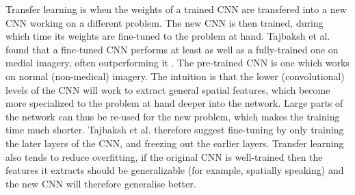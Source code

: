 Transfer learning is when the weights of a trained CNN are transfered into a new CNN working on a different problem. The new CNN is then trained, during which time its weights are fine-tuned to the problem at hand. Tajbaksh et al. found that a fine-tuned CNN performs at least as well as a fully-trained one on medial imagery, often outperforming it \cite{fineTune}. The pre-trained CNN is one which works on normal (non-medical) imagery. The intuition is that the lower (convolutional) levels of the CNN will work to extract general spatial features, which become more specialized to the problem at hand deeper into the network. Large parts of the network can thus be re-used for the new problem, which makes the training time much shorter. Tajbaksh et al. therefore suggest fine-tuning by only training the later layers of the CNN, and freezing out the earlier layers. Transfer learning also tends to reduce overfitting, if the original CNN is well-trained then the features it extracts should be generalizable (for example, spatially speaking) and the new CNN will therefore generalise better. 